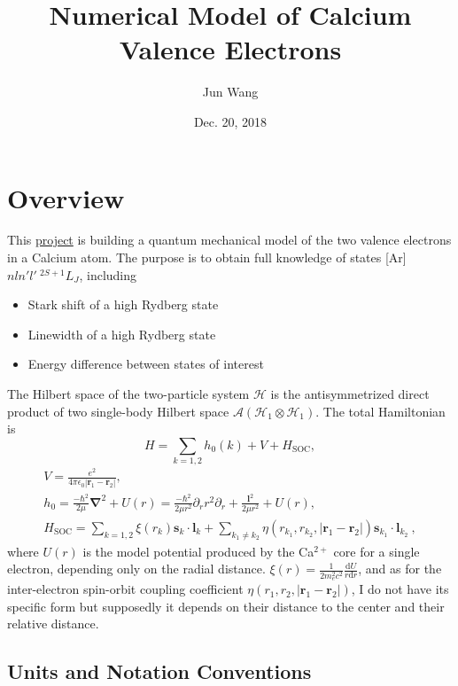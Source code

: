 \documentclass{article}
\title{Numerical Model of Calcium Valence Electrons}
\author{Jun Wang}
\date{Dec. 20, 2018}
\begin{document}
\maketitle
\section{Overview}
This \href{https://github.com/congzlwag/CaAtomSpec}{project} is building a quantum mechanical model of the two valence electrons in a Calcium atom. The purpose is to obtain full knowledge of states \textsf{[Ar]}$nln'l'~{}^{2S+1} L_J$, including
\begin{itemize}
\item Stark shift of a high Rydberg state
\item Linewidth of a high Rydberg state
\item Energy difference between states of interest
\end{itemize}

The Hilbert space of the two-particle system $\mathcal H$ is the antisymmetrized direct product of two single-body Hilbert space $\mathcal A (\mathcal H_1\otimes \mathcal H_1)$. The total Hamiltonian is 
\begin{equation}
H = \sum_{k=1,2} h_0(k) + V + H_\mathrm{SOC},
\end{equation}
\begin{gather}
V = \frac{e^2}{4\pi\epsilon_0 |\bm{r}_1-\bm{r}_2|},\\
h_0 = \frac{-\hbar^2}{2\mu}\bm{\nabla}^2 + U(r) = \frac{-\hbar^2}{2\mu r^2}\partial_r r^2\partial_r + \frac{\bm{l}^2}{2\mu r^2} + U(r),\\
H_\mathrm{SOC} = \sum_{k=1,2}\xi(r_k)\bm{s}_k\cdot\bm{l}_k + \sum_{k_1\neq k_2}\eta(r_{k_1},r_{k_2},|\bm{r}_1-\bm{r}_2|)\bm{s}_{k_1}\cdot\bm{l}_{k_2}~,
\end{gather}
where $U(r)$ is the model potential produced by the Ca${}^{2+}$ core for a single electron, depending only on the radial distance. $\xi(r) = \frac{1}{2m_e^2c^2}\frac{\mathrm{d}U}{r\mathrm{d}r}$, and as for the inter-electron spin-orbit coupling coefficient $\eta(r_1,r_2,|\bm{r}_1-\bm{r}_2|)$, I do not have its specific form but supposedly it depends on their distance to the center and their relative distance.

\subsection{Units and Notation Conventions}
\end{document}
